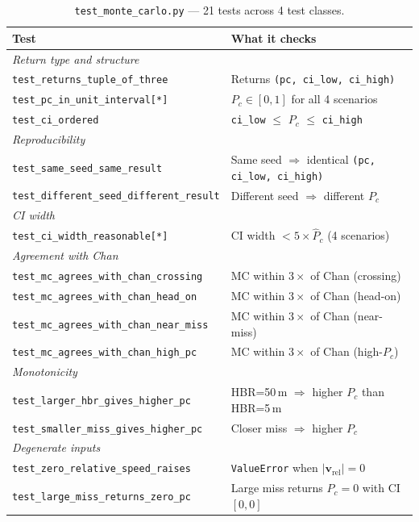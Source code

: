 \documentclass[11pt]{article}
\begin{document}
\begin{table}[htb]
\centering
\small
\caption{\texttt{test\_monte\_carlo.py} — 21 tests across 4 test classes.}
\label{tab:test_mc2d}
\begin{tabular}{lp{10cm}}
  \toprule
  Test & What it checks \\
  \midrule
  \multicolumn{2}{l}{\textit{Return type and structure}} \\
  \texttt{test\_returns\_tuple\_of\_three} & Returns \texttt{(pc, ci\_low, ci\_high)} \\
  \texttt{test\_pc\_in\_unit\_interval[*]} & $P_c \in [0,1]$ for all 4 scenarios \\
  \texttt{test\_ci\_ordered} & \texttt{ci\_low} $\le$ $P_c$ $\le$ \texttt{ci\_high} \\
  \midrule
  \multicolumn{2}{l}{\textit{Reproducibility}} \\
  \texttt{test\_same\_seed\_same\_result} & Same seed $\Rightarrow$ identical \texttt{(pc, ci\_low, ci\_high)} \\
  \texttt{test\_different\_seed\_different\_result} & Different seed $\Rightarrow$ different $P_c$ \\
  \midrule
  \multicolumn{2}{l}{\textit{CI width}} \\
  \texttt{test\_ci\_width\_reasonable[*]} & CI width $< 5 \times \hat{P}_c$ (4 scenarios) \\
  \midrule
  \multicolumn{2}{l}{\textit{Agreement with Chan}} \\
  \texttt{test\_mc\_agrees\_with\_chan\_crossing} & MC within $3\times$ of Chan (crossing) \\
  \texttt{test\_mc\_agrees\_with\_chan\_head\_on} & MC within $3\times$ of Chan (head-on) \\
  \texttt{test\_mc\_agrees\_with\_chan\_near\_miss} & MC within $3\times$ of Chan (near-miss) \\
  \texttt{test\_mc\_agrees\_with\_chan\_high\_pc} & MC within $3\times$ of Chan (high-$P_c$) \\
  \midrule
  \multicolumn{2}{l}{\textit{Monotonicity}} \\
  \texttt{test\_larger\_hbr\_gives\_higher\_pc} & HBR=50\,m $\Rightarrow$ higher $P_c$ than HBR=5\,m \\
  \texttt{test\_smaller\_miss\_gives\_higher\_pc} & Closer miss $\Rightarrow$ higher $P_c$ \\
  \midrule
  \multicolumn{2}{l}{\textit{Degenerate inputs}} \\
  \texttt{test\_zero\_relative\_speed\_raises} & \texttt{ValueError} when $|\mathbf{v}_\text{rel}|=0$ \\
  \texttt{test\_large\_miss\_returns\_zero\_pc} & Large miss returns $P_c = 0$ with CI $[0,0]$ \\
  \bottomrule
\end{tabular}
\end{table}
\end{document}
